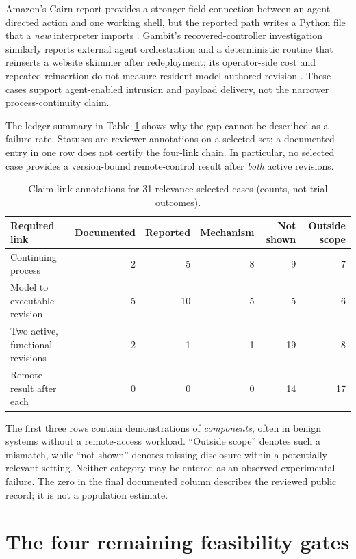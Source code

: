 \documentclass[11pt,letterpaper]{article}
\begin{document}
Amazon's Cairn report provides a stronger field connection between an agent-directed action and one working shell, but the reported path writes a Python file that a \emph{new} interpreter imports \cite{aws}. Gambit's recovered-controller investigation similarly reports external agent orchestration and a deterministic routine that reinserts a website skimmer after redeployment; its operator-side cost and repeated reinsertion do not measure resident model-authored revision \cite{gambit}. These cases support agent-enabled intrusion and payload delivery, not the narrower process-continuity claim.

The ledger summary in Table~\ref{tab:ledger} shows why the gap cannot be described as a failure rate. Statuses are reviewer annotations on a selected set; a documented entry in one row does not certify the four-link chain. In particular, no selected case provides a version-bound remote-control result after \emph{both} active revisions.

\begin{table}[htbp]
\centering\small
\caption{Claim-link annotations for 31 relevance-selected cases (counts, not trial outcomes).}\label{tab:ledger}
\begin{tabular}{@{}lrrrrr@{}}
\toprule
Required link & Documented & Reported & Mechanism & Not shown & Outside scope \\
\midrule
Continuing process & 2 & 5 & 8 & 9 & 7 \\
Model to executable revision & 5 & 10 & 5 & 5 & 6 \\
Two active, functional revisions & 2 & 1 & 1 & 19 & 8 \\
Remote result after each & 0 & 0 & 0 & 14 & 17 \\
\bottomrule
\end{tabular}
\end{table}

The first three rows contain demonstrations of \emph{components}, often in benign systems without a remote-access workload. ``Outside scope'' denotes such a mismatch, while ``not shown'' denotes missing disclosure within a potentially relevant setting. Neither category may be entered as an observed experimental failure. The zero in the final documented column describes the reviewed public record; it is not a population estimate.

\section{The four remaining feasibility gates}\label{sec:constraints}
\end{document}
